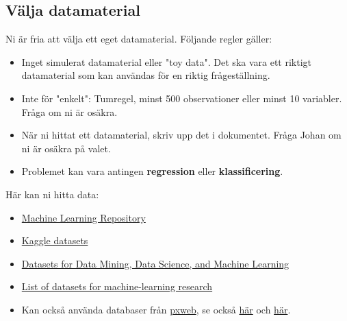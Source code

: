 \documentclass[a4paper]{article}
\begin{document}
\subsection*{Välja datamaterial}
Ni är fria att välja ett eget datamaterial. Följande regler gäller:
\begin{itemize}
    \item Inget simulerat datamaterial eller "toy data". Det ska vara ett riktigt datamaterial som kan användas för en riktig frågeställning.
    \item Inte för "enkelt": Tumregel, minst 500 observationer eller minst 10 variabler. Fråga om ni är osäkra.
    \item När ni hittat ett datamaterial, skriv upp det i dokumentet. Fråga Johan om ni är osäkra på valet.
    \item Problemet kan vara antingen \textbf{regression} eller \textbf{klassificering}.
\end{itemize}
Här kan ni hitta data:
\begin{itemize}
    \item \href{https://archive.ics.uci.edu/ml/index.php}{Machine Learning Repository}
    \item \href{https://www.kaggle.com/datasets}{Kaggle datasets}
    \item \href{https://www.kdnuggets.com/datasets/index.html}{Datasets for Data Mining, Data Science, and Machine Learning}
    \item \href{https://en.wikipedia.org/wiki/List_of_datasets_for_machine-learning_research}{List of datasets for machine-learning research}
    \item Kan också använda databaser från \href{https://cran.r-project.org/web/packages/pxweb/index.html}{pxweb}, se också \href{https://cran.r-project.org/web/packages/pxweb/vignettes/pxweb.html}{här} och \href{https://www.scb.se/en/services/statistical-programs-for-px-files/px-web/pxweb-examples/}{här}.
\end{itemize}
\end{document}
